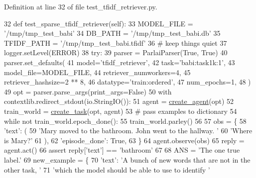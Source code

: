Definition at line 32 of file test\+\_\+tfidf\+\_\+retriever.\+py.


\begin{DoxyCode}
32     \textcolor{keyword}{def }test\_sparse\_tfidf\_retriever(self):
33         MODEL\_FILE = \textcolor{stringliteral}{'/tmp/tmp\_test\_babi'}
34         DB\_PATH = \textcolor{stringliteral}{'/tmp/tmp\_test\_babi.db'}
35         TFIDF\_PATH = \textcolor{stringliteral}{'/tmp/tmp\_test\_babi.tfidf'}
36         \textcolor{comment}{# keep things quiet}
37         logger.setLevel(ERROR)
38         \textcolor{keywordflow}{try}:
39             parser = ParlaiParser(\textcolor{keyword}{True}, \textcolor{keyword}{True})
40             parser.set\_defaults(
41                 model=\textcolor{stringliteral}{'tfidf\_retriever'},
42                 task=\textcolor{stringliteral}{'babi:task1k:1'},
43                 model\_file=MODEL\_FILE,
44                 retriever\_numworkers=4,
45                 retriever\_hashsize=2 ** 8,
46                 datatype=\textcolor{stringliteral}{'train:ordered'},
47                 num\_epochs=1,
48             )
49             opt = parser.parse\_args(print\_args=\textcolor{keyword}{False})
50             with contextlib.redirect\_stdout(io.StringIO()):
51                 agent = \hyperlink{namespaceparlai_1_1core_1_1agents_ad0d54074d4bcc148bb415ab5515a53b5}{create\_agent}(opt)
52                 train\_world = \hyperlink{namespaceparlai_1_1core_1_1worlds_a11923c10b545c7ecc1b08fe2242d9c2c}{create\_task}(opt, agent)
53             \textcolor{comment}{# pass examples to dictionary}
54             \textcolor{keywordflow}{while} \textcolor{keywordflow}{not} train\_world.epoch\_done():
55                 train\_world.parley()
56 
57             obs = \{
58                 \textcolor{stringliteral}{'text'}: (
59                     \textcolor{stringliteral}{'Mary moved to the bathroom. John went to the hallway. '}
60                     \textcolor{stringliteral}{'Where is Mary?'}
61                 ),
62                 \textcolor{stringliteral}{'episode\_done'}: \textcolor{keyword}{True},
63             \}
64             agent.observe(obs)
65             reply = agent.act()
66             \textcolor{keyword}{assert} reply[\textcolor{stringliteral}{'text'}] == \textcolor{stringliteral}{'bathroom'}
67 
68             ANS = \textcolor{stringliteral}{'The one true label.'}
69             new\_example = \{
70                 \textcolor{stringliteral}{'text'}: \textcolor{stringliteral}{'A bunch of new words that are not in the other task, '}
71                 \textcolor{stringliteral}{'which the model should be able to use to identify '}

\end{DoxyCode}
